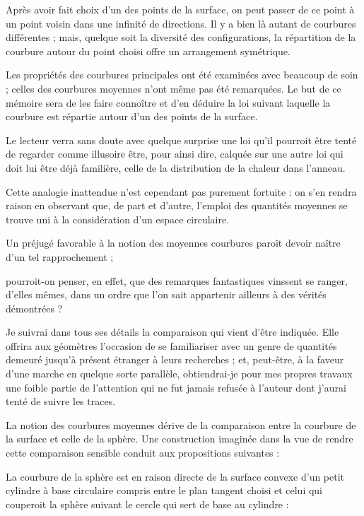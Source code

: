\documentclass[11pt,a4paper]{article}
\begin{document}
Après avoir fait choix d'un des points de la surface, on peut passer de ce
point à un point voisin dans une infinité de directions. Il y a bien là
autant de courbures différentes ; mais, quelque soit la diversité des
configurations, la répartition de la courbure autour du point choisi offre un
arrangement symétrique.

Les propriétés des courbures principales ont été examinées avec beaucoup de
soin ; celles des courbures moyennes n'ont même pas été remarquées. Le but de
ce mémoire sera de les faire connoître et d'en déduire la loi suivant
laquelle la courbure est répartie autour d'un des points de la surface.

Le lecteur verra sans doute avec quelque surprise une loi qu'il pourroit être
tenté de regarder comme illusoire être, pour ainsi dire, calquée sur une
autre loi qui doit lui être déjà familière, celle de la distribution de la
chaleur dans l'anneau.

Cette analogie inattendue n'est cependant pas purement fortuite : on s'en
rendra raison en observant que, de part et d'autre, l'emploi des quantités
moyennes se trouve uni à la considération d'un espace circulaire.

Un préjugé favorable à la notion des moyennes courbures paroît devoir naître
d'un tel rapprochement ;

pourroit-on penser, en effet, que des remarques fantastiques vinssent se
ranger, d'elles mêmes, dans un ordre que l'on sait appartenir ailleurs à des
vérités démontrées ?

Je suivrai dans tous ses détails la comparaison qui vient d'être indiquée.
Elle offrira aux géomètres l'occasion de se familiariser avec un genre de
quantités demeuré jusqu'à présent étranger à leurs recherches ; et,
peut-être, à la faveur d'une marche en quelque sorte parallèle,
obtiendrai-je pour mes propres travaux une foible partie de l'attention qui
ne fut jamais refusée à l'auteur dont j'aurai tenté de suivre les traces.

La notion des courbures moyennes dérive de la comparaison entre la courbure
de la surface et celle de la sphère. Une construction imaginée dans la vue de
rendre cette comparaison sensible conduit aux propositions suivantes :

La courbure de la sphère est en raison directe de la surface convexe d'un
petit cylindre à base circulaire compris entre le plan tangent
 choisi et celui qui couperoit la sphère suivant le cercle
qui sert de base au cylindre :
\end{document}
